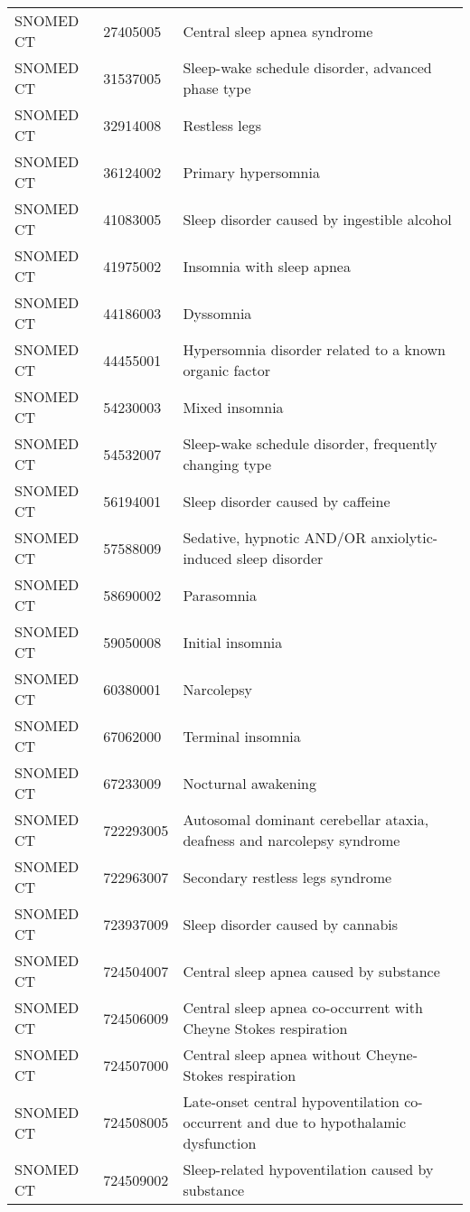 \begin{longtable}{p{}p{}p{}}
  SNOMED CT & 27405005 & Central sleep apnea syndrome \\ 
  SNOMED CT & 31537005 & Sleep-wake schedule disorder, advanced phase type \\ 
  SNOMED CT & 32914008 & Restless legs \\ 
  SNOMED CT & 36124002 & Primary hypersomnia \\ 
  SNOMED CT & 41083005 & Sleep disorder caused by ingestible alcohol \\ 
  SNOMED CT & 41975002 & Insomnia with sleep apnea \\ 
  SNOMED CT & 44186003 & Dyssomnia \\ 
  SNOMED CT & 44455001 & Hypersomnia disorder related to a known organic factor \\ 
  SNOMED CT & 54230003 & Mixed insomnia \\ 
  SNOMED CT & 54532007 & Sleep-wake schedule disorder, frequently changing type \\ 
  SNOMED CT & 56194001 & Sleep disorder caused by caffeine \\ 
  SNOMED CT & 57588009 & Sedative, hypnotic AND/OR anxiolytic-induced sleep disorder \\ 
  SNOMED CT & 58690002 & Parasomnia \\ 
  SNOMED CT & 59050008 & Initial insomnia \\ 
  SNOMED CT & 60380001 & Narcolepsy \\ 
  SNOMED CT & 67062000 & Terminal insomnia \\ 
  SNOMED CT & 67233009 & Nocturnal awakening \\ 
  SNOMED CT & 722293005 & Autosomal dominant cerebellar ataxia, deafness and narcolepsy syndrome \\ 
  SNOMED CT & 722963007 & Secondary restless legs syndrome \\ 
  SNOMED CT & 723937009 & Sleep disorder caused by cannabis \\ 
  SNOMED CT & 724504007 & Central sleep apnea caused by substance \\ 
  SNOMED CT & 724506009 & Central sleep apnea co-occurrent with Cheyne Stokes respiration \\ 
  SNOMED CT & 724507000 & Central sleep apnea without Cheyne-Stokes respiration \\ 
  SNOMED CT & 724508005 & Late-onset central hypoventilation co-occurrent and due to hypothalamic dysfunction \\ 
  SNOMED CT & 724509002 & Sleep-related hypoventilation caused by substance \\ 

\end{longtable}
